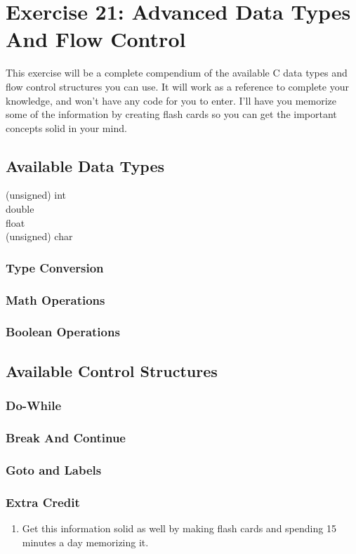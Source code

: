 \chapter{Exercise 21: Advanced Data Types And Flow Control}

This exercise will be a complete compendium of the available C data types and
flow control structures you can use.  It will work as a reference to complete
your knowledge, and won't have any code for you to enter.  I'll have you
memorize some of the information by creating flash cards so you can get 
the important concepts solid in your mind.

\section{Available Data Types}

\begin{description}
\item[(unsigned) int]
\item[double]
\item[float]
\item[(unsigned) char]
\end{description}


\subsection{Type Conversion}


\subsection{Math Operations}


\subsection{Boolean Operations}


\section{Available Control Structures}

\subsection{Do-While}

\subsection{Break And Continue}

\subsection{Goto and Labels}

\subsection{Extra Credit}

\begin{enumerate}
\item Get this information solid as well by making flash cards and spending 15 
    minutes a day memorizing it.
\end{enumerate}
